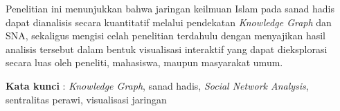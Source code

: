 Penelitian ini menunjukkan bahwa jaringan keilmuan Islam pada sanad hadis dapat dianalisis secara kuantitatif melalui pendekatan \textit{Knowledge Graph} dan SNA, sekaligus mengisi celah penelitian terdahulu dengan menyajikan hasil analisis tersebut dalam bentuk visualisasi interaktif yang dapat dieksplorasi secara luas oleh peneliti, mahasiswa, maupun masyarakat umum.

\vspace{0.5cm}
\noindent\textbf{Kata kunci} : \textit{Knowledge Graph}, sanad hadis, \textit{Social Network Analysis}, sentralitas perawi, visualisasi jaringan
